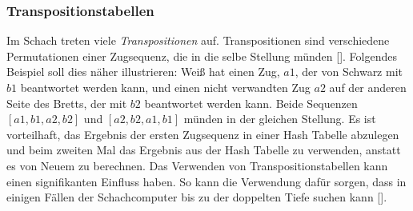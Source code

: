 \subsubsection{Transpositionstabellen} \label{ch:transposition-tables}

Im Schach treten viele \textit{Transpositionen} auf.
Transpositionen sind verschiedene Permutationen einer Zugsequenz, die in die selbe Stellung münden [\cite{Russell2010}].
Folgendes Beispiel soll dies näher illustrieren: Weiß hat einen Zug, $a1$, der von Schwarz mit $b1$ beantwortet werden kann, und einen nicht verwandten Zug $a2$ auf der anderen Seite des Bretts, der mit $b2$ beantwortet werden kann.
Beide Sequenzen $[a1, b1, a2, b2]$ und $[a2, b2, a1, b1]$ münden in der gleichen Stellung.
Es ist vorteilhaft, das Ergebnis der ersten Zugsequenz in einer Hash Tabelle abzulegen und beim zweiten Mal das Ergebnis aus der Hash Tabelle zu verwenden, anstatt es von Neuem zu berechnen.
Das Verwenden von Transpositionstabellen kann einen signifikanten Einfluss haben.
So kann die Verwendung dafür sorgen, dass in einigen Fällen der Schachcomputer bis zu der doppelten Tiefe suchen kann [\cite{Russell2010}].
